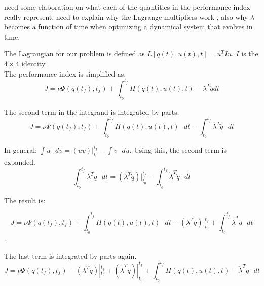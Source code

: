 {\color{red} need some elaboration on what each of the quantities in the performance index really represent. need to explain why the Lagrange multipliers work , also why $\lambda$ becomes a function of time when optimizing a dynamical system that evolves in time.} 


The Lagrangian for our problem is defined as $ L[q(t),u(t),t] = u^T I u $. $I$ is the $4\times4$ identity.\\

The performance index is simplified as:\\

\begin{equation}
    J = \nu \Psi ( q(t_f),t_f ) + \int_{t_0}^{t_f}  H(q(t),u(t),t) - \lambda^T \ddot q  dt
\end{equation}

The second term in the integrand is integrated by parts.\\

\begin{equation}
    J = \nu \Psi ( q(t_f),t_f ) + \int_{t_0}^{t_f}  H(q(t),u(t),t) \text{  } dt - \int_{t_0}^{t_f} \lambda^T \ddot q \text{  } dt
\end{equation}

In general:  $\int u \text{  }dv =  (uv)|_{t_0}^{t_f} - \int v \text{  }du $. Using this, the second term is expanded.\\

\begin{equation}
    \int_{t_0}^{t_f} \lambda^T \ddot q \text{  } dt  =  (\lambda^T \dot q) |_{t_0}^{t_f} - \int_{t_0}^{t_f} \dot \lambda^T  \dot q\text{  } dt
\end{equation}

The result is:

\begin{equation}
    J = \nu \Psi ( q(t_f),t_f ) + \int_{t_0}^{t_f}  H(q(t),u(t),t) \text{  } dt -(\lambda^T \dot q) |_{t_0}^{t_f} + \int_{t_0}^{t_f} \dot \lambda^T  \dot q\text{  } dt
\end{equation}.


The last term is integrated by parts again.\\

\begin{equation}
    J = \nu \Psi ( q(t_f),t_f ) - (\lambda^T \dot q)|_{t_0}^{t_f} + (\dot \lambda^T  q)|_{t_0}^{t_f} + \int_{t_0}^{t_f}  H(q(t),u(t),t) - \ddot \lambda^T q \text{  }dt
\end{equation}


